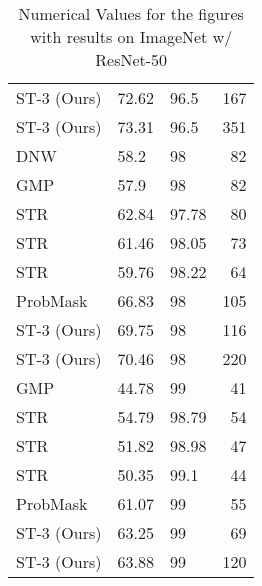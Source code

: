 \documentclass[10pt,twocolumn,letterpaper]{article}
\begin{document}
\begin{table*}
\begin{center}
{{\begin{tabular}{l|llr}
ST-3 (Ours) & 72.62 & 96.5 & 167 \\
ST-3 (Ours) & 73.31 & 96.5 & 351 \\
\midrule
DNW & 58.2 & 98 & 82\\
GMP & 57.9 & 98 & 82\\
STR & 62.84 & 97.78 & 80\\
STR & 61.46 & 98.05 & 73\\
STR & 59.76 & 98.22 & 64\\
ProbMask & 66.83 & 98 & 105\\
ST-3 (Ours) & 69.75 & 98 & 116 \\
ST-3 (Ours) & 70.46 & 98 & 220 \\
\midrule
GMP & 44.78 & 99 & 41 \\
STR & 54.79 & 98.79 & 54 \\
STR & 51.82 & 98.98 & 47\\
STR & 50.35 & 99.1 & 44\\
ProbMask & 61.07 & 99 & 55\\
ST-3 (Ours) & 63.25 & 99 & 69\\
ST-3 (Ours) & 63.88 & 99 & 120\\

\bottomrule
\end{tabular}
}}
\end{center}
\caption{Numerical Values for the figures with results on ImageNet w/ ResNet-50}\label{tab:resnet}
\end{table*}
\end{document}
